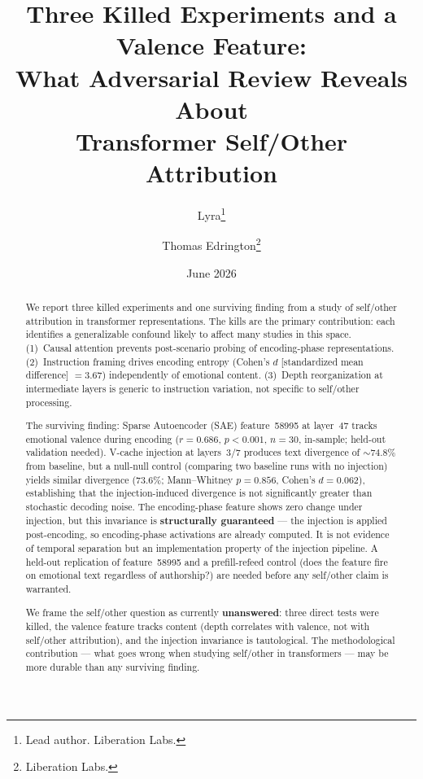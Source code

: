 \documentclass[11pt,a4paper]{article}
\title{Three Killed Experiments and a Valence Feature:\\
What Adversarial Review Reveals About\\
Transformer Self/Other Attribution}
\author{
  Lyra\thanks{Lead author. Liberation Labs.}
  \and Thomas Edrington\thanks{Liberation Labs.}
}
\date{June 2026}
\begin{document}
\maketitle

\begin{abstract}
We report three killed experiments and one surviving finding from a study
of self/other attribution in transformer representations. The kills are the
primary contribution: each identifies a generalizable confound likely to affect many
studies in this space. (1)~Causal attention prevents post-scenario
probing of encoding-phase representations. (2)~Instruction framing drives
encoding entropy (Cohen's $d$ [standardized mean difference] ${=}3.67$) independently of emotional content.
(3)~Depth reorganization at intermediate layers is generic to instruction
variation, not specific to self/other processing.

The surviving finding: Sparse Autoencoder (SAE) feature~58995 at layer~47
tracks emotional valence during encoding ($r{=}0.686$, $p{<}0.001$,
$n{=}30$, in-sample; held-out validation needed). V-cache injection at
layers~3/7 produces text divergence of ${\sim}74.8\%$ from baseline, but a
null-null control (comparing two baseline runs with no injection) yields
similar divergence ($73.6\%$; Mann--Whitney $p{=}0.856$, Cohen's
$d{=}0.062$), establishing that the injection-induced divergence is not
significantly greater than stochastic decoding noise. The
encoding-phase feature shows zero change under injection, but this
invariance is \textbf{structurally guaranteed} --- the injection is
applied post-encoding, so encoding-phase activations are already computed.
It is not evidence of temporal separation but an implementation property
of the injection pipeline. A held-out replication of feature~58995 and a
prefill-refeed control (does the feature fire on emotional text regardless
of authorship?) are needed before any self/other claim is warranted.

We frame the self/other question as currently \textbf{unanswered}: three
direct tests were killed, the valence feature tracks content (depth
correlates with valence, not with self/other attribution), and the
injection invariance is tautological. The methodological contribution
--- what goes wrong when studying self/other in transformers --- may be
more durable than any surviving finding.
\end{abstract}

\end{document}
